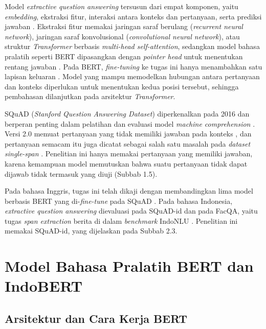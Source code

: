 Model \textit{extractive question answering} tersusun dari empat komponen, yaitu \textit{embedding}, ekstraksi fitur, interaksi antara konteks dan pertanyaan, serta prediksi jawaban \parencite{wang2022extractive}. Ekstraksi fitur memakai jaringan saraf berulang (\textit{recurrent neural network}), jaringan saraf konvolusional (\textit{convolutional neural network}), atau struktur \textit{Transformer} berbasis \textit{multi-head self-attention}, sedangkan model bahasa pralatih seperti BERT dipasangkan dengan \textit{pointer head} untuk menentukan rentang jawaban \parencite{wang2022extractive}. Pada BERT, \textit{fine-tuning} ke tugas ini hanya menambahkan satu lapisan keluaran \parencite{raikwar2024five}. Model yang mampu memodelkan hubungan antara pertanyaan dan konteks diperlukan untuk menentukan kedua posisi tersebut, sehingga pembahasan dilanjutkan pada arsitektur \textit{Transformer}.

SQuAD (\textit{Stanford Question Answering Dataset}) diperkenalkan pada 2016 dan berperan penting dalam pelatihan dan evaluasi model \textit{machine comprehension} \parencite{rajpurkar2016squad, raikwar2024five}. Versi 2.0 memuat pertanyaan yang tidak memiliki jawaban pada konteks \parencite{rajpurkar2018squad}, dan pertanyaan semacam itu juga dicatat sebagai salah satu masalah pada \textit{dataset} \textit{single-span} \parencite{wang2022extractive}. Penelitian ini hanya memakai pertanyaan yang memiliki jawaban, karena kemampuan model memutuskan bahwa suatu pertanyaan tidak dapat dijawab tidak termasuk yang diuji (Subbab 1.5).

Pada bahasa Inggris, tugas ini telah dikaji dengan membandingkan lima model berbasis BERT yang di-\textit{fine-tune} pada SQuAD \parencite{raikwar2024five}. Pada bahasa Indonesia, \textit{extractive question answering} dievaluasi pada SQuAD-id \parencite{muis2020sequence, ramaputra2026evaluating, suhendra2026matrik} dan pada FacQA, yaitu tugas \textit{span extraction} berita di dalam \textit{benchmark} IndoNLU \parencite{wilie2020indonlu}. Penelitian ini memakai SQuAD-id, yang dijelaskan pada Subbab 2.3.

\section{Model Bahasa Pralatih BERT dan IndoBERT}

\subsection{Arsitektur dan Cara Kerja BERT}

